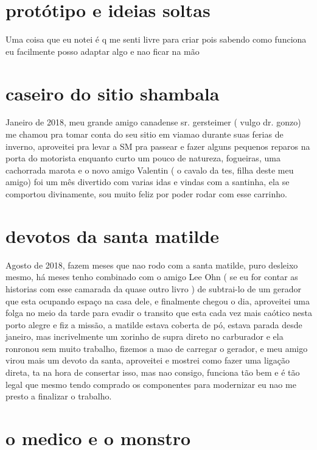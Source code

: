 \documentclass[a4paper]{report}
\begin{document}

\section*{prot\'otipo e ideias soltas}
Uma coisa que eu notei \'e q me senti livre para criar pois sabendo como funciona eu facilmente posso adaptar algo e nao ficar na m\~ao


\section*{caseiro do sitio shambala}


Janeiro de 2018, meu grande amigo canadense sr. gersteimer ( vulgo dr. gonzo) me chamou pra tomar conta do seu sitio em viamao durante suas ferias de inverno, aproveitei pra levar a SM pra passear e fazer alguns pequenos reparos na porta do motorista enquanto curto um pouco de natureza, fogueiras, uma cachorrada marota e o novo amigo Valentin ( o cavalo da tes, filha deste meu amigo) foi um m\^es divertido com varias idas e vindas com a santinha, ela se comportou divinamente, sou muito feliz por poder rodar com esse carrinho. 


\section*{devotos da santa matilde}

Agosto de 2018, fazem meses que nao rodo com a santa matilde, puro desleixo mesmo, h\'a meses tenho combinado com o amigo Lee Ohn ( se eu for contar as historias com esse camarada da quase outro livro ) de subtrai-lo de um gerador que esta ocupando espa\c{c}o na casa dele, e finalmente chegou o dia, aproveitei uma folga no meio da tarde para evadir o transito que esta cada vez mais ca\'otico nesta porto alegre e fiz a miss\~ao, a matilde estava coberta de p\'o, estava parada desde janeiro, mas incrivelmente um xorinho de supra direto no carburador e ela ronronou sem muito trabalho, fizemos a mao de carregar o gerador, e meu amigo virou mais um devoto da santa, aproveitei e mostrei como fazer uma liga\c{c}\~ao direta, ta na hora de consertar isso, mas nao consigo, funciona t\~ao bem e \'e t\~ao legal que mesmo tendo comprado os componentes para modernizar eu nao me presto a finalizar o trabalho. 

\section*{o medico e o monstro}
\end{document}
